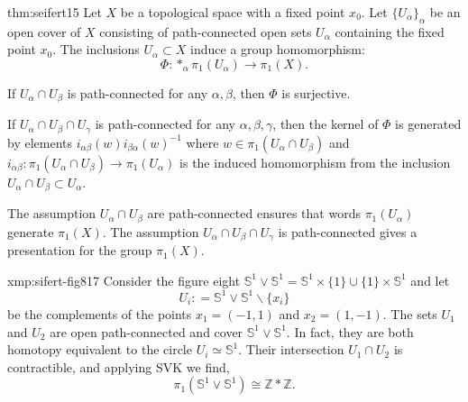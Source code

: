 \documentclass[landscape, 8pt]{extarticle}
\begin{document}
\begin{multicols*}{3}
\begin{thm}{thm:seifert}{15}
	Let $X$ be a topological space with a fixed point $x_{0}$. Let $\{U_{\alpha}\}_{\alpha}$ be an open cover of $X$ consisting of path-connected open sets $U_{\alpha}$ containing the fixed point $x_{0}$. The inclusions $U_{\alpha} \subset X$ induce a group homomorphism:
	\[\Phi : \ast_{\alpha} \pi_{1}(U_{\alpha}) \to \pi_{1}(X).\]
	\begin{enumerate-zero}
	    \item If $U_{\alpha} \cap U_{\beta}$ is path-connected for any $\alpha, \beta$, then $\Phi$ is surjective.
	    \item If $U_{\alpha} \cap U_{\beta} \cap U_{\gamma}$ is path-connected for any $\alpha, \beta, \gamma$, then the kernel of $\Phi$ is generated by elements $i_{\alpha\beta}(w) i_{\beta\alpha}(w)^{-1}$ where $w \in \pi_{1}(U_{\alpha} \cap U_{\beta})$ and $i_{\alpha\beta} : \pi_{1}(U_{\alpha} \cap U_{\beta}) \to \pi_{1}(U_{\alpha})$ is the induced homomorphism from the inclusion $U_{\alpha} \cap U_{\beta} \subset U_{\alpha}$.
	\end{enumerate-zero}

	The assumption $U_{\alpha} \cap U_{\beta}$ are path-connected ensures that words $\pi_{1}(U_{\alpha})$ generate $\pi_{1}(X)$. The assumption $U_{\alpha} \cap U_{\beta} \cap U_{\gamma}$ is path-connected gives a presentation for the group $\pi_{1}(X)$.
\end{thm}

\begin{xmp}{xmp:sifert-fig8}{17}
	Consider the figure eight $\mathbb{S}^{1} \vee \mathbb{S}^{1} = \mathbb{S}^{1} \times \{1\} \cup \{1\} \times \mathbb{S}^{1}$ and let
	\[U_{i} : = \mathbb{S}^{1} \vee \mathbb{S}^{1} \backslash \{x_{i}\}\]
	be the complements of the points $x_{1} = (-1,1)$ and $x_{2} = (1, -1)$. The sets $U_{1}$ and $U_{2}$ are open path-connected and cover $\mathbb{S}^{1} \vee \mathbb{S}^{1}$. In fact, they are both homotopy equivalent to the circle $U_{i} \simeq \mathbb{S}^{1}$. Their intersection $U_{1} \cap U_{2}$ is contractible, and applying SVK we find,
	\[\pi_{1}(\mathbb{S}^{1} \vee \mathbb{S}^{1}) \cong \mathbb{Z} \ast \mathbb{Z}.\]
\end{xmp}


\end{multicols*}
\end{document}
